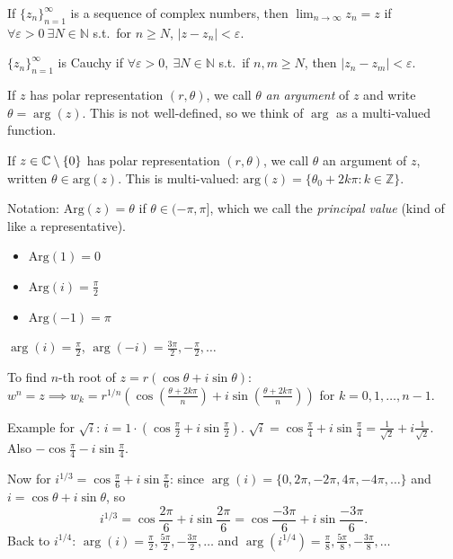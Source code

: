 \documentclass[11pt]{article}
\begin{document}
\begin{definition}
If $\{z_n\}_{n=1}^\infty$ is a sequence of complex numbers, then $\lim_{n\to\infty} z_n = z$ if $\forall \varepsilon > 0\ \exists N \in \mathbb{N}$ s.t.\ for $n \ge N$, $|z-z_n| < \varepsilon$.
\end{definition}

\begin{definition}
$\{z_n\}_{n=1}^\infty$ is Cauchy if $\forall \varepsilon > 0,\ \exists N \in \mathbb{N}$ s.t.\ if $n,m \ge N$, then $|z_n - z_m| < \varepsilon$.
\end{definition}

If $z$ has polar representation $(r,\theta)$, we call $\theta$ \emph{an argument} of $z$ and write $\theta = \arg(z)$. This is not well-defined, so we think of $\arg$ as a multi-valued function.

\begin{definition}
If $z \in {\mathbb{C}} \setminus \{0\}$ has polar representation $(r,\theta)$, we call $\theta$ an argument of $z$, written $\theta \in \mathrm{arg}(z)$.
This is multi-valued: $\mathrm{arg}(z) = \{ \theta_0 + 2k\pi : k \in \mathbb{Z} \}$.

Notation: $\mathrm{Arg}(z) = \theta$ if $\theta \in (-\pi,\pi]$, which we call the \emph{principal value} (kind of like a representative).
\begin{itemize}
    \item $\mathrm{Arg}(1) = 0$
    \item $\mathrm{Arg}(i) = \frac{\pi}{2}$
    \item $\mathrm{Arg}(-1) = \pi$
\end{itemize}
\end{definition}

\begin{example}
$\arg(i) = \tfrac{\pi}{2}$, $\arg(-i) = \tfrac{3\pi}{2}, -\tfrac{\pi}{2}, \dots$
\end{example}

\begin{example}
To find $n$-th root of $z = r(\cos\theta + i\sin\theta)$:
$w^n = z \implies w_k = r^{1/n} \left( \cos\left(\frac{\theta + 2k\pi}{n}\right) + i \sin\left(\frac{\theta + 2k\pi}{n}\right) \right)$ for $k = 0, 1, \dots, n-1$.

Example for $\sqrt{i}$:
$i = 1 \cdot (\cos\frac{\pi}{2} + i\sin\frac{\pi}{2})$.
$\sqrt{i} = \cos\frac{\pi}{4} + i\sin\frac{\pi}{4} = \frac{1}{\sqrt{2}} + i \frac{1}{\sqrt{2}}$.
Also $-\cos\frac{\pi}{4} - i\sin\frac{\pi}{4}$.

\medskip
Now for $i^{1/3} = \cos\frac{\pi}{6} + i\sin\frac{\pi}{6}$: since $\arg(i) = \{0, 2\pi, -2\pi, 4\pi, -4\pi, \dots\}$ and $i = \cos\theta + i\sin\theta$, so
\[
i^{1/3} = \cos\frac{2\pi}{6} + i\sin\frac{2\pi}{6} = \cos\frac{-3\pi}{6} + i\sin\frac{-3\pi}{6}.
\]
Back to $i^{1/4}$: $\arg(i) = \tfrac{\pi}{2}, \tfrac{5\pi}{2}, -\tfrac{3\pi}{2}, \dots$ and $\arg(i^{1/4}) = \tfrac{\pi}{8}, \tfrac{5\pi}{8}, -\tfrac{3\pi}{8}, \dots$
\end{example}
\end{document}
